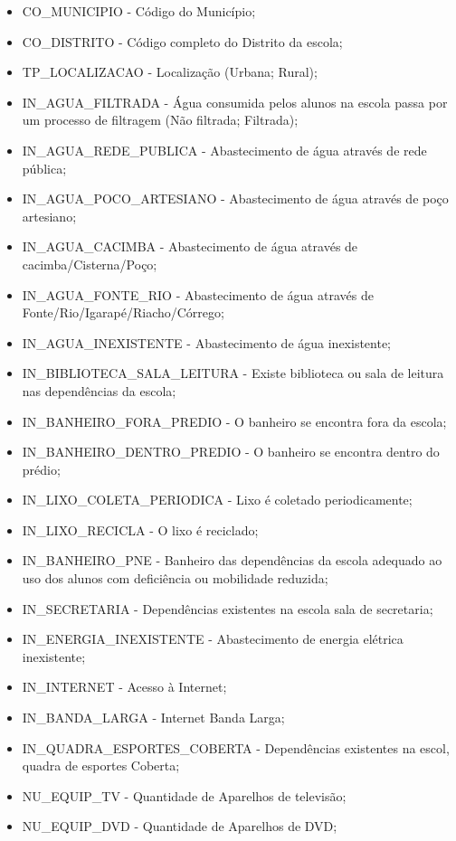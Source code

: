 	\begin{itemize}
		\item CO\_MUNICIPIO - Código do Município;
		\item CO\_DISTRITO - Código completo do Distrito da escola;
		\item TP\_LOCALIZACAO - Localização (Urbana; Rural);
		\item IN\_AGUA\_FILTRADA - Água consumida pelos alunos na escola passa por um processo de filtragem (Não filtrada; Filtrada);
		\item IN\_AGUA\_REDE\_PUBLICA - Abastecimento de água através de rede pública;
		\item IN\_AGUA\_POCO\_ARTESIANO - Abastecimento de água através de poço artesiano;
		\item IN\_AGUA\_CACIMBA - Abastecimento de água através de cacimba/Cisterna/Poço;
		\item IN\_AGUA\_FONTE\_RIO - Abastecimento de água através de Fonte/Rio/Igarapé/Riacho/Córrego;
		\item IN\_AGUA\_INEXISTENTE - Abastecimento de água inexistente;
		\item IN\_BIBLIOTECA\_SALA\_LEITURA - Existe biblioteca ou sala de leitura nas dependências da escola;
		\item IN\_BANHEIRO\_FORA\_PREDIO - O banheiro se encontra fora da escola;
		\item IN\_BANHEIRO\_DENTRO\_PREDIO - O banheiro se encontra dentro do prédio;
		\item IN\_LIXO\_COLETA\_PERIODICA - Lixo é coletado periodicamente;
		\item IN\_LIXO\_RECICLA - O lixo é reciclado;
		\item IN\_BANHEIRO\_PNE - Banheiro das dependências da escola adequado ao uso dos alunos com deficiência ou mobilidade reduzida;
		\item IN\_SECRETARIA - Dependências existentes na escola sala de secretaria;
		\item IN\_ENERGIA\_INEXISTENTE - Abastecimento de energia elétrica inexistente;
		\item IN\_INTERNET - Acesso à Internet;
		\item IN\_BANDA\_LARGA - Internet Banda Larga;
		\item IN\_QUADRA\_ESPORTES\_COBERTA - Dependências existentes na escol, quadra de esportes Coberta;
		\item NU\_EQUIP\_TV - Quantidade de Aparelhos de televisão;
		\item NU\_EQUIP\_DVD - Quantidade de Aparelhos de DVD;

\end{itemize}
